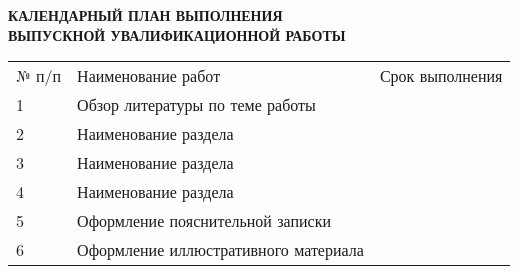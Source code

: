 \begin{center}
	\textbf{
		КАЛЕНДАРНЫЙ ПЛАН ВЫПОЛНЕНИЯ \\
		ВЫПУСКНОЙ УВАЛИФИКАЦИОННОЙ РАБОТЫ
	}

	\vspace*{2cm}

	\confirmation

	\vspace*{3cm}
	
	\worktitle

	\vspace*{4cm}
	
	\begin{tabularx}{\textwidth}{ l X l }
		№ п/п & Наименование работ & Срок выполнения \\
		1 & Обзор литературы по теме работы & \\
		2 & Наименование раздела & \\
		3 & Наименование раздела & \\
		4 & Наименование раздела & \\
		5 & Оформление пояснительной записки & \\
		6 & Оформление иллюстративного материала & \\
	\end{tabularx}

	\vspace*{4cm}

	\subsblock
\end{center}

\clearpage
